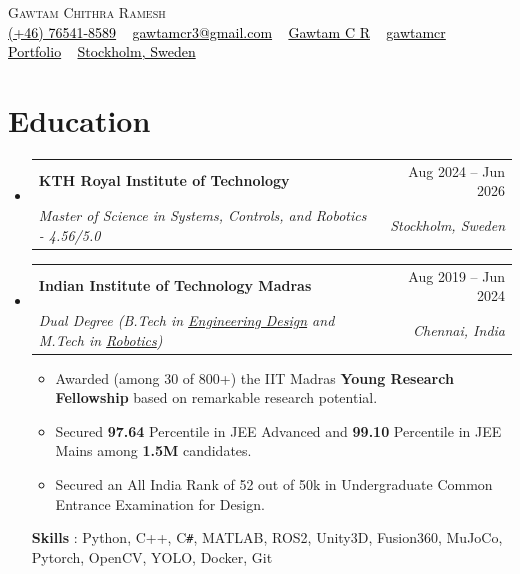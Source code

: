 \documentclass[letterpaper, 11pt]{article}
\makeatletter
\newcommand{\resumeSubheading}[4]{
\vspace{-2pt}
\item
\begin{tabular*}{1.0\textwidth}[t]{l@{\extracolsep{\fill}}r}
	\textbf{#1}       & {\small #2} \\
     [-2pt]
	\textit{{\small#3}} & \textit{\small #4} \\
\end{tabular*}
\vspace{-10pt}
}
\newcommand{\resumeSubHeadingListStart}{\begin{itemize}[leftmargin=0.0in, label={}]}
\newcommand{\resumeSubHeadingListEnd}{\end{itemize}\vspace{-1em}}
\makeatother
\begin{document}
	
\begin{center}
    {\Huge \scshape Gawtam Chithra Ramesh} \\
    \vspace{3pt}
    \small 
    { %
    \href{tel:+46764518589}{{\faMobile*} \textcolor{black}{(+46) 76541-8589}} ~
    \href{mailto:gawtamcr3@gmail.com}{{\faPaperPlane} \textcolor{black}{gawtamcr3@gmail.com}} ~
    \href{https://linkedin.com/in/gawtamcr/}{{\faLinkedinIn} \textcolor{black}{Gawtam C R}} ~
    \href{https://github.com/gawtamcr}{{\faGithub} \textcolor{black}{gawtamcr}} ~
    \href{https://gawtamcr.github.io/}{{\faGlobe} \textcolor{black}{Portfolio}} ~
    \href{https://maps.google.com/?q=Stockholm,Sweden}{{\faMapMarker*} \textcolor{black}{Stockholm, Sweden}}
    }
    \vspace{-8pt}
\end{center}

\section{\color{Blue}Education}
    \resumeSubHeadingListStart 
    \resumeSubheading {KTH Royal Institute of Technology}{Aug 2024 -- Jun 2026}{Master of Science in Systems, Controls, and Robotics - 4.56/5.0}{Stockholm, Sweden}
    \resumeSubheading {Indian Institute of Technology Madras}{Aug 2019 -- Jun 2024}{Dual Degree (B.Tech in \href{https://ed.iitm.ac.in/about.html}{Engineering Design} and M.Tech in \href{https://ed.iitm.ac.in/~robotics_lab/}{Robotics})}{Chennai, India}
    \vspace{-0.3em}
    \small{
    \begin{itemize}[leftmargin=0.15in]
        \setlength{\itemsep}{-0.3em}
        \item Awarded (among 30 of 800+) the IIT Madras \textbf{Young Research Fellowship} based on remarkable research potential.
        \item Secured \textbf{97.64} Percentile in JEE Advanced and \textbf{99.10} Percentile in JEE Mains among \textbf{1.5M} candidates.
        \item Secured an All India Rank of 52 out of 50k in Undergraduate Common Entrance Examination for Design.
    \end{itemize}
    }
    \vspace{-0.7em}
    \textbf{Skills} : Python, C++, C\texttt{\#}, MATLAB, ROS2, Unity3D, Fusion360, MuJoCo, Pytorch, OpenCV, YOLO, Docker, Git
    \resumeSubHeadingListEnd
\end{document}
